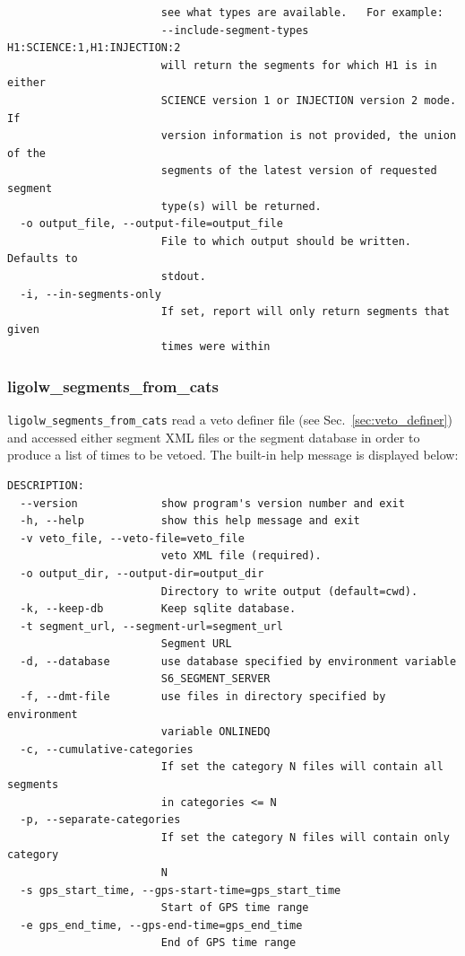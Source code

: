 {\begin{verbatim}
                        see what types are available.   For example:
                        --include-segment-types H1:SCIENCE:1,H1:INJECTION:2
                        will return the segments for which H1 is in either
                        SCIENCE version 1 or INJECTION version 2 mode. If
                        version information is not provided, the union of the
                        segments of the latest version of requested segment
                        type(s) will be returned.
  -o output_file, --output-file=output_file
                        File to which output should be written.  Defaults to
                        stdout.
  -i, --in-segments-only
                        If set, report will only return segments that given
                        times were within
\end{verbatim}
}



\subsubsection{ligolw\_segments\_from\_cats}
\label{ssec:from_cats}

\texttt{ligolw\_segments\_from\_cats} read a veto definer file (see
Sec.~\ref{sec:veto_definer}) and accessed either segment XML files
or the segment database in order to produce a list of times to be
vetoed.  The built-in help message is displayed below:
%
{\small
\begin{verbatim}
DESCRIPTION:
  --version             show program's version number and exit
  -h, --help            show this help message and exit
  -v veto_file, --veto-file=veto_file
                        veto XML file (required).
  -o output_dir, --output-dir=output_dir
                        Directory to write output (default=cwd).
  -k, --keep-db         Keep sqlite database.
  -t segment_url, --segment-url=segment_url
                        Segment URL
  -d, --database        use database specified by environment variable
                        S6_SEGMENT_SERVER
  -f, --dmt-file        use files in directory specified by environment
                        variable ONLINEDQ
  -c, --cumulative-categories
                        If set the category N files will contain all segments
                        in categories <= N
  -p, --separate-categories
                        If set the category N files will contain only category
                        N
  -s gps_start_time, --gps-start-time=gps_start_time
                        Start of GPS time range
  -e gps_end_time, --gps-end-time=gps_end_time
                        End of GPS time range
\end{verbatim}
}

